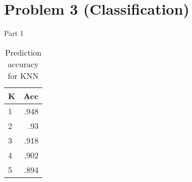\documentclass[11pt]{article}
\begin{document}
\section*{Problem 3 (Classification)}

Part 1

\begin{table}[!th]
\centering
\begin{tabular}{|l|r|}
\hline
K &  Acc \\
\hline
1 & .948 \\
2 & .93  \\
3 & .918 \\
4 & .902 \\
5 & .894 \\
\hline
\end{tabular}
\caption{Prediction accuracy for KNN}
\label{ex:table}
\end{table}
\end{document}
